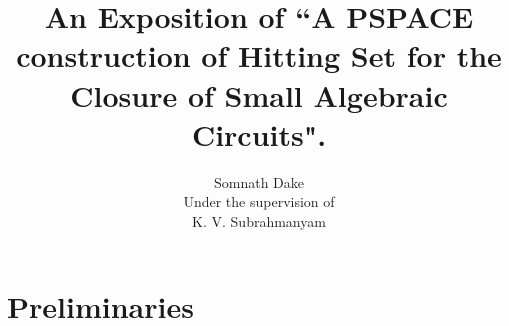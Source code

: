 














\title{An Exposition of ``A PSPACE construction of Hitting Set for the Closure of Small Algebraic Circuits".}
\author{Somnath Dake\\
{\tiny Under the supervision of}\\ 
K. V. Subrahmanyam}


\allowdisplaybreaks
\maketitle
\abs
\pagebreak
\tableofcontents
\pagebreak
\intro
\notations
\section{Preliminaries}
\algcpx
\markov
\norms
\conciq
\geo
\enet
\hittset
\exthr
\algo
\rrref

